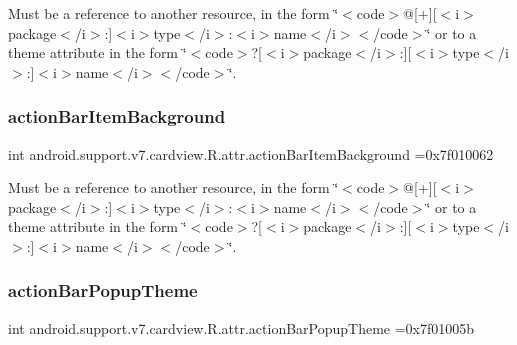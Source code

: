 Must be a reference to another resource, in the form \char`\"{}$<$code$>$@\mbox{[}+\mbox{]}\mbox{[}$<$i$>$package$<$/i$>$\+:\mbox{]}$<$i$>$type$<$/i$>$\+:$<$i$>$name$<$/i$>$$<$/code$>$\char`\"{} or to a theme attribute in the form \char`\"{}$<$code$>$?\mbox{[}$<$i$>$package$<$/i$>$\+:\mbox{]}\mbox{[}$<$i$>$type$<$/i$>$\+:\mbox{]}$<$i$>$name$<$/i$>$$<$/code$>$\char`\"{}. \mbox{\label{classandroid_1_1support_1_1v7_1_1cardview_1_1R_1_1attr_ae4a87147b65e560b5f3446acbd9a8ad7}} 
\subsubsection{\texorpdfstring{action\+Bar\+Item\+Background}{actionBarItemBackground}}
{\footnotesize\ttfamily int android.\+support.\+v7.\+cardview.\+R.\+attr.\+action\+Bar\+Item\+Background =0x7f010062\hspace{0.3cm}{\ttfamily [static]}}

Must be a reference to another resource, in the form \char`\"{}$<$code$>$@\mbox{[}+\mbox{]}\mbox{[}$<$i$>$package$<$/i$>$\+:\mbox{]}$<$i$>$type$<$/i$>$\+:$<$i$>$name$<$/i$>$$<$/code$>$\char`\"{} or to a theme attribute in the form \char`\"{}$<$code$>$?\mbox{[}$<$i$>$package$<$/i$>$\+:\mbox{]}\mbox{[}$<$i$>$type$<$/i$>$\+:\mbox{]}$<$i$>$name$<$/i$>$$<$/code$>$\char`\"{}. \mbox{\label{classandroid_1_1support_1_1v7_1_1cardview_1_1R_1_1attr_a70ff332804ed3c7f1cc950f6cf913588}} 
\subsubsection{\texorpdfstring{action\+Bar\+Popup\+Theme}{actionBarPopupTheme}}
{\footnotesize\ttfamily int android.\+support.\+v7.\+cardview.\+R.\+attr.\+action\+Bar\+Popup\+Theme =0x7f01005b\hspace{0.3cm}{\ttfamily [static]}}

